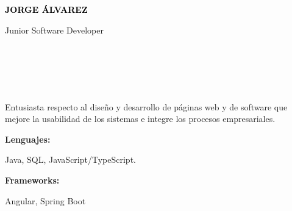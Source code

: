 \documentclass[9pt]{./src/developercv} %
\begin{document}
\begin{minipage}[t]{0.5\textwidth}
	\vspace{-\baselineskip}
	{ \fontsize{16}{20} \textcolor{black}{\textbf{\MakeUppercase{Jorge Álvarez}}}}
	\vspace{6pt}

	{\Large Junior Software Developer}
\end{minipage}
\hfill
\begin{minipage}[t]{0.3\textwidth}
	\vspace{-\baselineskip}
	\\
	\\
	\\
	\\
\end{minipage}

\begin{minipage}[t]{0.46\textwidth}
	\vspace{-6pt}

	Entusiasta respecto al diseño y desarrollo de páginas
	web y de software que mejore la usabilidad de los sistemas
	e integre los procesos empresariales.
\end{minipage}
\hfill
\begin{minipage}[t]{0.465\textwidth}
	\vspace{-6pt}

	\begin{minipage}[t]{0.2\textwidth}
		\textbf{Lenguajes:}
	\end{minipage}
	\hfill
	\begin{minipage}[t]{0.73\textwidth}
		Java, SQL, JavaScript/TypeScript.
	\end{minipage}
	\vspace{4mm}

	\begin{minipage}[t]{0.2\textwidth}
		\textbf{Frameworks:}
	\end{minipage}
	\hfill
	\begin{minipage}[t]{0.73\textwidth}
		Angular, Spring Boot
	\end{minipage}

\end{minipage}
\end{document}
